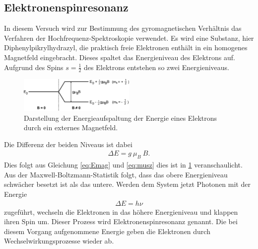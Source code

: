 \subsection{Elektronenspinresonanz}

In diesem Versuch wird zur Bestimmung des gyromagnetischen Verhältnis das Verfahren der Hochfrequenz-Spektroskopie verwendet.
Es wird eine Substanz, hier Diphenylpikrylhydrazyl, die praktisch freie Elektronen enthält in ein homogenes Magnetfeld eingebracht. Dieses 
spaltet das Energieniveau des Elektrons auf. Aufgrund des Spins $s = \tfrac{1}{2}$ des Elektrons entstehen so zwei Energieniveaus.%
\newpage
\begin{figure}
	\centering
	\includegraphics[width=0.5\textwidth]{../Grafiken/EnergieAufspaltung.pdf}
	\caption{Darstellung der Energieaufspaltung der Energie eines Elektrons durch ein externes Magnetfeld.\cite{V28}}\label{fig:Aufspaltung}
\end{figure}
Die Differenz der beiden Niveaus ist dabei 
\begin{align}
	\Delta E = g\ \mu_B \ B.
\end{align}
Dies folgt aus Gleichung \eqref{eq:Emag} und \eqref{eq:musz} dies ist in \cref{fig:Aufspaltung} veranschaulicht.
Aus der Maxwell-Boltzmann-Statistik folgt, dass das obere Energieniveau schwächer besetzt ist als das untere.
Werden dem System jetzt Photonen mit der Energie
\begin{align}
	\Delta E = h\nu
	\label{eq:energie}
\end{align}
zugeführt, wechseln die Elektronen in das höhere Energieniveau und klappen ihren Spin um.
Dieser Prozess wird Elektronenspinresonanz genannt.
Die bei diesem Vorgang aufgenommene Energie geben die Elektronen durch Wechselwirkungsprozesse wieder ab. 

{ %

}


